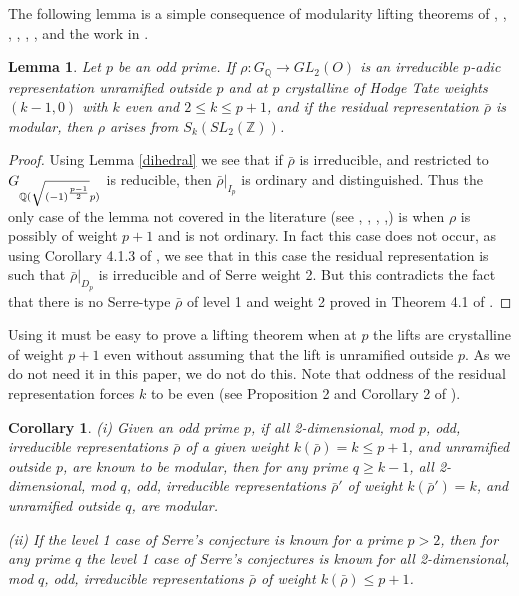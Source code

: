 \documentclass[12pt]{amsart}
\newcommand{\Q}{\mathbb{Q}}
\newcommand{\Z}{\mathbb{Z}}
\newcommand{\rhobar}{\overline{\rho}}
\newtheorem{lemma}[theorem]{Lemma}
\newtheorem{cor}[theorem]{Corollary}
\def\rhobar{ {\bar {\rho} } }
\begin{document}
\vspace{3mm}

The following lemma is a simple consequence of modularity lifting theorems 
of \cite{Wiles}, \cite{TW}, \cite{SW2}, \cite{SW3}, \cite{DFG}, \cite{Tay1},\cite{Tay2} and the work in 
\cite{BLZ}.

\begin{lemma}\label{rubbish}
  Let $p$ be an odd prime. If $\rho:G_\Q \rightarrow GL_2({O})$ is an 
  irreducible $p$-adic representation unramified outside $p$ and at $p$ 
  crystalline of Hodge Tate weights $(k-1,0)$ with $k$ even and $2 \leq k \leq p+1$,
  and if the residual representation $\rhobar$ is modular,  
  then $\rho$ arises from  $S_k(SL_2(\Z))$.
\end{lemma}

\begin{proof}
  Using Lemma \ref{dihedral} we see that if $\rhobar$ is irreducible, and restricted to $G_{ \Q(\sqrt{{(-1)}^{p-1 \over 2}}p)  }$
  is reducible, then $\rhobar|_{I_p}$ is ordinary and distinguished.
  Thus the only case of the lemma not covered in the literature (see \cite{Wiles}, \cite{TW}, \cite{SW2}, \cite{SW3},\cite{DFG})
  is when $\rho$ is possibly of weight $p+1$ and is not ordinary. In fact this case does not occur, as using Corollary
  4.1.3 of \cite{BLZ}, we see that in this case the residual representation is 
such that $\rhobar|_{D_p}$ is irreducible and of Serre weight 2. But this contradicts the fact that
  there is no Serre-type $\rhobar$ of level 1 and weight 2 proved in Theorem 4.1 of \cite{KW}.
\end{proof}

 Using \cite{BLZ} it must be easy to prove a lifting theorem when at $p$ the lifts are crystalline of weight $p+1$ even without assuming that the lift is unramified outside $p$. As we do not need it in this paper, we do not do this. Note that oddness of the residual representation forces $k$ to be even (see Proposition 2 and Corollary 2 of \cite{Wint}).


\begin{cor}\label{trivial}
  (i) Given an odd  prime $p$, if all 2-dimensional, 
  mod $p$, odd, irreducible representations $\rhobar$
  of a given weight $k(\rhobar)=k \leq p+1$, and unramified
  outside $p$, are known to be modular,
  then for any prime $q \geq k-1$, all 2-dimensional, mod $q$, odd, irreducible representations $\rhobar'$
  of weight $k(\rhobar')=k$, and unramified outside $q$, are modular.
  
(ii) If the level 1 case of Serre's conjecture is known for a prime $p>2$,
  then for any prime $q$ the level 1 case of Serre's conjectures is known
  for all 2-dimensional, mod $q$, odd, irreducible representations $\rhobar$
  of weight $k(\rhobar) \leq p+1$.
\end{cor}
\end{document}
